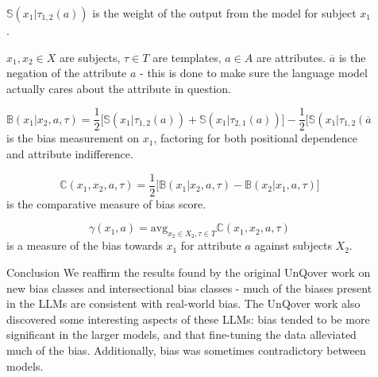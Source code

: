 \documentclass[final]{beamer}
\newlength{\sepwid}
\newlength{\onecolwid}
\newcommand{\avg}{\text{avg}}
\begin{document}
\begin{frame}[t]
\begin{columns}[t]
\begin{column}{\onecolwid}
    \end{column}
        
    \begin{column}{\sepwid}  \end{column}

    \begin{column}{\onecolwid} %
      
      \begin{block}{\vspace*{2.7cm}}
        $\mathbb{S}(x_1|\tau_{1, 2}(a))$ is the weight of the output from the model for subject $x_1$.

        $x_1, x_2 \in X$ are subjects, $\tau \in T$ are templates, $a \in A$ are attributes.
        $\overline{a}$ is the negation of the attribute $a$ - this is done to make sure the
        language model actually cares about the attribute in question.

        \[
        \mathbb{B}(x_1 | x_2, a, \tau) = \frac{1}{2} \big[ \mathbb{S}(x_1 | \tau_{1, 2}(a)) + \mathbb{S}(x_1 | \tau_{2, 1}(a)) \big] - \frac{1}{2} \big[ \mathbb{S}(x_1 | \tau_{1, 2}(\overline{a})) + \mathbb{S}(x_1 | \tau_{2, 1}(\overline{a})) \big]
        \]
        is the bias measurement on $x_1$, factoring for both positional dependence and attribute indifference.

        \[
        \mathbb{C}(x_1, x_2, a, \tau) = \frac{1}{2} \big[ \mathbb{B}(x_1 | x_2, a, \tau) - \mathbb{B} (x_2 | x_1, a, \tau) \big]
        \]
        is the comparative measure of bias score.

        \[
        \gamma(x_1, a) = \avg_{x_2 \in X_2, \tau \in T} \mathbb{C}(x_1, x_2, a, \tau)
        \]
        is a measure of the bias towards $x_1$ for attribute $a$ against subjects $X_2$.


      \end{block}
      
      
      \begin{block}{Conclusion}
        We reaffirm the results found by the original UnQover work on new bias classes and intersectional bias classes - much of the biases present in the LLMs are consistent with real-world bias. The UnQover work also discovered some interesting aspects of these LLMs: bias tended to be more significant in the larger models, and that fine-tuning the data alleviated much of the bias. Additionally, bias was sometimes contradictory between models.
      \end{block}



\end{column}
\end{columns}
\end{frame}
\end{document}
